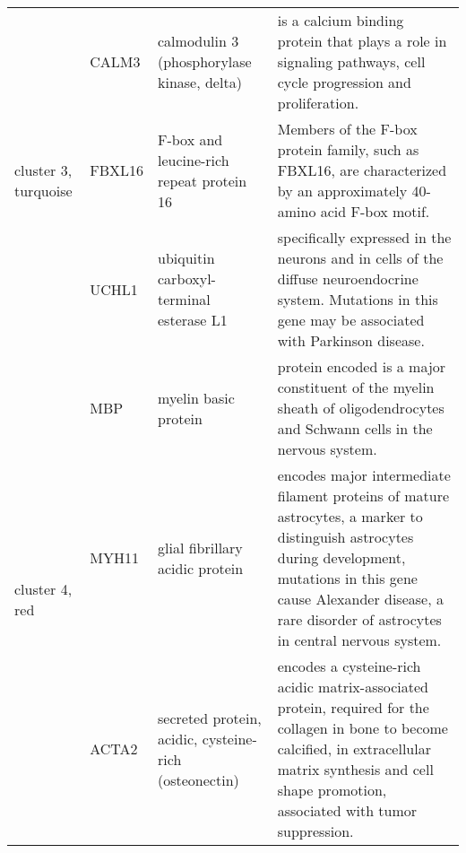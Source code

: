 \begin{table}[htp]
\begin{center}
\begin{tabular}{|p{0.7in}|p{0.5in}|p{1.4in}|p{3.6in}|}
 \multirow{3}{4em}{\small{cluster 3, turquoise}}  &  \small{CALM3} & \footnotesize{calmodulin 3 (phosphorylase kinase, delta)} & \scriptsize{ is a calcium binding protein that plays a role in signaling pathways, cell cycle progression and proliferation.}   \\ 
 					      & \small{FBXL16} &  \footnotesize{F-box and leucine-rich repeat protein 16} & \scriptsize{ Members of the F-box protein family, such as FBXL16, are characterized by an approximately 40-amino acid F-box motif.} \\
					      & \small{UCHL1} & \footnotesize{ubiquitin carboxyl-terminal esterase L1} & \scriptsize{specifically expressed in the neurons and in cells of the diffuse neuroendocrine system. Mutations in this gene may be associated with Parkinson disease.} \\
 \hline
 \multirow{3}{4em}{\small{cluster 4,  red}} & \small{MBP} & \footnotesize{myelin basic protein} & \scriptsize{protein encoded is a major constituent of the myelin sheath of oligodendrocytes and Schwann cells in the nervous system.} \\
 					    & \small{MYH11} & \footnotesize{glial fibrillary acidic protein} & \scriptsize{ encodes major intermediate filament proteins of mature astrocytes, a marker to distinguish astrocytes during development, mutations in this gene cause Alexander disease, a rare disorder of astrocytes in central nervous system.} \\
					    & \small{ACTA2}  & \footnotesize{secreted protein, acidic, cysteine-rich (osteonectin)}  & \scriptsize{encodes a cysteine-rich acidic matrix-associated protein, required for the collagen in bone to become calcified, in extracellular matrix synthesis and cell shape promotion, associated with tumor suppression.}\\
\hline
\end{tabular}
 \end{center} \label{tab:tab2}
\end{table}

